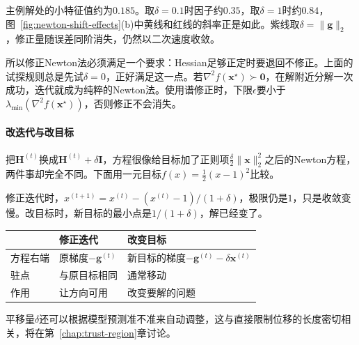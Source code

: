 主例解处的小特征值约为$0.185$。取$\delta=0.1$时因子约$0.35$，取$\delta=1$时约$0.84$，图~\ref{fig:newton-shift-effects}(b)中黄线和红线的斜率正是如此。紫线取$\delta=\lVert\bm{g}\rVert_2$，修正量随误差同阶消失，仍然以二次速度收敛。

所以修正Newton法必须满足一个要求：Hessian足够正定时要退回不修正。上面的试探规则总是先试$\delta=0$，正好满足这一点。若$\nabla^2f(\bm{x}^\star)\succ\bm{0}$，在解附近分解一次成功，迭代就成为纯粹的Newton法。使用谱修正时，下限$\epsilon$要小于$\lambda_{\min}(\nabla^2f(\bm{x}^\star))$，否则修正不会消失。

\paragraph{改迭代与改目标}
把$\bm{H}^{(t)}$换成$\bm{H}^{(t)}+\delta\bm{I}$，方程很像给目标加了正则项$\tfrac\delta2\lVert\bm{x}\rVert_2^2$之后的Newton方程，两件事却完全不同。下面用一元目标$f(x)=\tfrac12(x-1)^2$比较。

修正迭代时，$x^{(t+1)}=x^{(t)}-(x^{(t)}-1)/(1+\delta)$，极限仍是$1$，只是收敛变慢。改目标时，新目标的最小点是$1/(1+\delta)$，解已经变了。

\begin{BookInlineTable}
  \centering
  \begin{tabular}{@{}lll@{}}
    \toprule
    & 修正迭代 & 改变目标 \\
    \midrule
    方程右端 & 原梯度$-\bm{g}^{(t)}$ & 新目标的梯度$-\bm{g}^{(t)}-\delta\bm{x}^{(t)}$ \\
    驻点 & 与原目标相同 & 通常移动 \\
    作用 & 让方向可用 & 改变要解的问题 \\
    \bottomrule
  \end{tabular}
  \caption{曲率修正和正则化的区别。修正只影响路径，不影响梯度为零的点。}
  \label{tab:newton-modify-vs-regularize}
\end{BookInlineTable}

平移量$\delta$还可以根据模型预测准不准来自动调整，这与直接限制位移的长度密切相关，将在第~\ref{chap:trust-region}章讨论。
